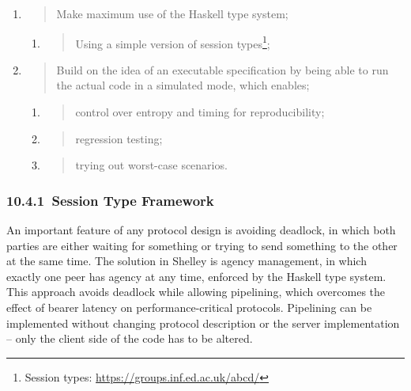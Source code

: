 \documentclass[]{article}
\begin{document}
\begin{enumerate}
\def\labelenumi{\arabic{enumi}.}
\item
  \begin{quote}
  Make maximum use of the Haskell type system;
  \end{quote}

  \begin{enumerate}
  \def\labelenumii{\alph{enumii}.}
  \item
    \begin{quote}
    Using a simple version of session types\footnote{Session types:
      \href{https://groups.inf.ed.ac.uk/abcd/}{{https://groups.inf.ed.ac.uk/abcd/}}};
    \end{quote}
  \end{enumerate}
\item
  \begin{quote}
  Build on the idea of an executable specification by being able to run
  the actual code in a simulated mode, which enables;
  \end{quote}

  \begin{enumerate}
  \def\labelenumii{\alph{enumii}.}
  \setcounter{enumii}{1}
  \item
    \begin{quote}
    control over entropy and timing for reproducibility;
    \end{quote}
  \item
    \begin{quote}
    regression testing;
    \end{quote}
  \item
    \begin{quote}
    trying out worst-case scenarios.
    \end{quote}
  \end{enumerate}
\end{enumerate}

\hypertarget{session-type-framework}{%
\subsubsection{​10.4.1​~Session Type
Framework}\label{session-type-framework}}

An important feature of any protocol design is avoiding deadlock, in
which both parties are either waiting for something or trying to send
something to the other at the same time. The solution in Shelley is
agency management, in which exactly one peer has agency at any time,
enforced by the Haskell type system. This approach avoids deadlock while
allowing pipelining, which overcomes the effect of bearer latency on
performance-critical protocols. Pipelining can be implemented without
changing protocol description or the server implementation -- only the
client side of the code has to be altered.
\end{document}
